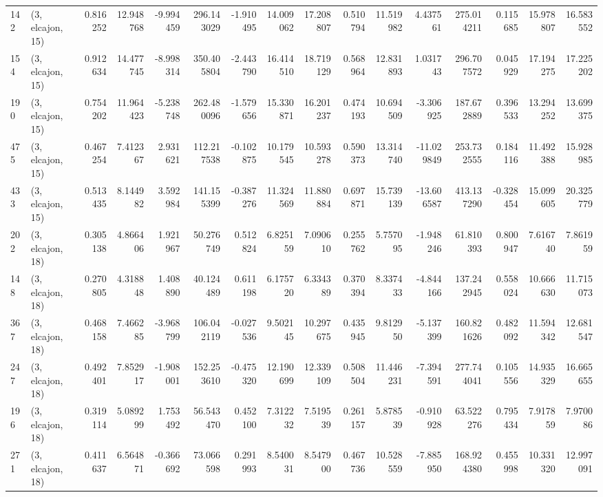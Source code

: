 \begin{tabular}{llrrrrrrrrrrrrrr}
142 &  (3, elcajon, 15) &   0.816252 &  12.948768 &  -9.994459 &   296.143029 &  -1.910495 &  14.009062 &  17.208807 &  0.510794 &  11.519982 &   4.437561 &   275.014211 &  0.115685 &  15.978807 &  16.583552 \\
154 &  (3, elcajon, 15) &   0.912634 &  14.477745 &  -8.998314 &   350.405804 &  -2.443790 &  16.414510 &  18.719129 &  0.568964 &  12.831893 &   1.031743 &   296.707572 &  0.045929 &  17.194275 &  17.225202 \\
190 &  (3, elcajon, 15) &   0.754202 &  11.964423 &  -5.238748 &   262.480096 &  -1.579656 &  15.330871 &  16.201237 &  0.474193 &  10.694509 &  -3.306925 &   187.672889 &  0.396533 &  13.294252 &  13.699375 \\
475 &  (3, elcajon, 15) &   0.467254 &   7.412367 &   2.931621 &   112.217538 &  -0.102875 &  10.179545 &  10.593278 &  0.590373 &  13.314740 & -11.029849 &   253.732555 &  0.184116 &  11.492388 &  15.928985 \\
433 &  (3, elcajon, 15) &   0.513435 &   8.144982 &   3.592984 &   141.155399 &  -0.387276 &  11.324569 &  11.880884 &  0.697871 &  15.739139 & -13.606587 &   413.137290 & -0.328454 &  15.099605 &  20.325779 \\
202 &  (3, elcajon, 18) &   0.305138 &   4.866406 &   1.921967 &    50.276749 &   0.512824 &   6.825159 &   7.090610 &  0.255762 &   5.757095 &  -1.948246 &    61.810393 &  0.800947 &   7.616740 &   7.861959 \\
148 &  (3, elcajon, 18) &   0.270805 &   4.318848 &   1.408890 &    40.124489 &   0.611198 &   6.175720 &   6.334389 &  0.370394 &   8.337433 &  -4.844166 &   137.242945 &  0.558024 &  10.666630 &  11.715073 \\
367 &  (3, elcajon, 18) &   0.468158 &   7.466285 &  -3.968799 &   106.042119 &  -0.027536 &   9.502145 &  10.297675 &  0.435945 &   9.812950 &  -5.137399 &   160.821626 &  0.482092 &  11.594342 &  12.681547 \\
247 &  (3, elcajon, 18) &   0.492401 &   7.852917 &  -1.908001 &   152.253610 &  -0.475320 &  12.190699 &  12.339109 &  0.508504 &  11.446231 &  -7.394591 &   277.744041 &  0.105556 &  14.935329 &  16.665655 \\
196 &  (3, elcajon, 18) &   0.319114 &   5.089299 &   1.753492 &    56.543470 &   0.452100 &   7.312232 &   7.519539 &  0.261157 &   5.878539 &  -0.910928 &    63.522276 &  0.795434 &   7.917859 &   7.970086 \\
271 &  (3, elcajon, 18) &   0.411637 &   6.564871 &  -0.366692 &    73.066598 &   0.291993 &   8.540031 &   8.547900 &  0.467736 &  10.528559 &  -7.885950 &   168.924380 &  0.455998 &  10.331320 &  12.997091 \\

\end{tabular}

